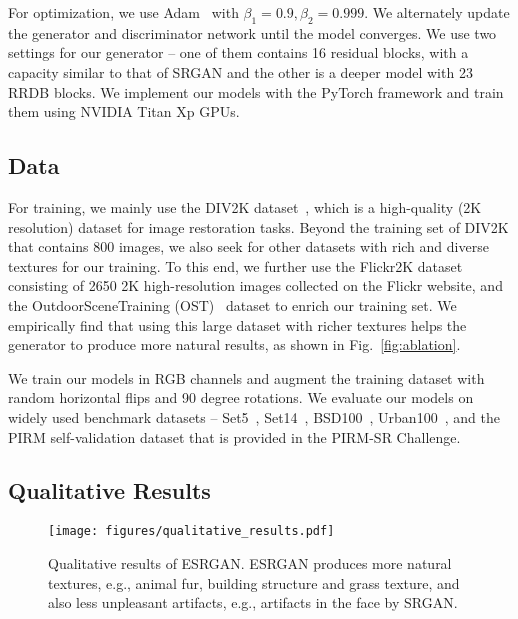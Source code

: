 \documentclass[runningheads]{llncs}
\begin{document}
For optimization, we use Adam~\cite{kingma2014adam} with $\beta_1=0.9, \beta_2=0.999$. 
We alternately update the generator and discriminator network until the model converges.
%
We use two settings for our generator -- one of them contains 16 residual blocks, with a capacity similar to that of 
SRGAN and the
other is a deeper model with 23 RRDB blocks.
%
We implement our models with the PyTorch framework and train them using NVIDIA Titan Xp GPUs.


\subsection{Data}
For training, we mainly use the DIV2K dataset~\cite{agustsson2017ntire}, which is a high-quality (2K resolution) 
dataset 
for image restoration tasks. 
%
Beyond the training set of DIV2K that contains 800 images, we also seek for other datasets with rich and diverse 
textures for our training.
To this end, we further use the Flickr2K dataset~\cite{timofte2017ntire} consisting of 
2650 2K high-resolution images collected on the Flickr website, and the OutdoorSceneTraining 
(OST)~\cite{wang2018sftgan} 
dataset to enrich our training set. 
%
We empirically find that using this large dataset with richer textures helps the generator to produce more natural 
results, as shown in Fig.~\ref{fig:ablation}.


We train our models in RGB channels and augment the training dataset with random horizontal flips and 90 degree 
rotations.
%
We evaluate our models on widely used benchmark datasets -- Set5~\cite{bevilacqua2012low}, 
Set14~\cite{zeyde2010single}, BSD100~\cite{martin2001database}, Urban100~\cite{huang2015single}, and the
PIRM self-validation dataset that is provided in the PIRM-SR Challenge.

\subsection{Qualitative Results}

\begin{figure}[htbp]
	\begin{center}
		\texttt{[image: figures/qualitative\_results.pdf]}
	\end{center}
	\vspace{-0.5cm}
	\caption{Qualitative results of ESRGAN. ESRGAN produces more natural textures, e.g., animal fur, building structure 
		and grass texture, and also less unpleasant artifacts, e.g., artifacts in the face by SRGAN.}
	\label{fig:qualitative_results}
	\vspace{-0.3cm}
\end{figure}
\end{document}
